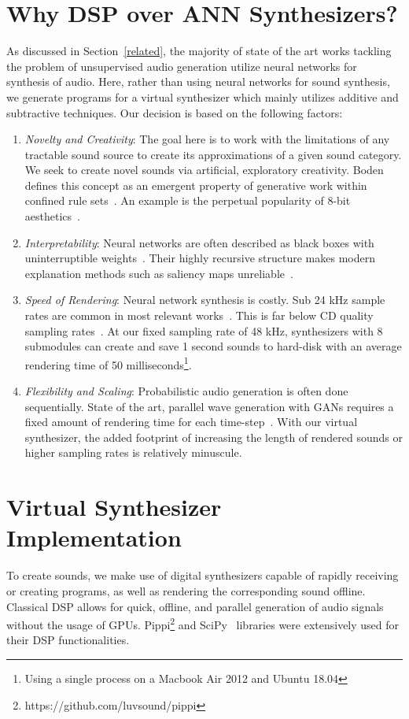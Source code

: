 \documentclass[\main/thesis.tex]{subfiles}
\begin{document}
\section{Why DSP over ANN Synthesizers?}
 As discussed in Section~\ref{related}, the majority of state of the art works tackling the problem of unsupervised audio generation utilize neural networks for synthesis of audio. Here, rather than using neural networks for sound synthesis, we generate programs for a virtual synthesizer which mainly utilizes additive and subtractive techniques. Our decision is based on the following factors:
\begin{enumerate}[label=(\roman*)]
    \item \textit{Novelty and Creativity}: The goal here is to work with the limitations of any tractable sound source to create its approximations of a given sound category. We seek to create novel sounds via artificial, exploratory creativity. Boden defines this concept as an emergent property of generative work within confined rule sets~\cite{boden2009computer}. An example is the perpetual popularity of 8-bit aesthetics~\cite{collins2007loop}. 
    \item \textit{Interpretability}: Neural networks are often described as black boxes with uninterruptible weights~\cite{basheer2000artificial}. Their highly recursive structure makes modern explanation methods such as saliency maps unreliable~\cite{rudin2019stop}.  
    \item \textit{Speed of Rendering}: Neural network synthesis is costly. Sub 24 kHz sample rates are common in most relevant works~\cite{yamamoto2020parallel,oord2017parallel,aouameur2019neural,ramires2020neural}. This is far below CD quality sampling rates~\cite{reiss2016meta}. At our fixed sampling rate of 48 kHz, synthesizers with 8 submodules can create and save 1 second sounds to hard-disk with an average rendering time of 50 milliseconds\footnote{Using a single process on a Macbook Air 2012 and Ubuntu 18.04}. 
    \item \textit{Flexibility and Scaling}: Probabilistic audio generation is often done sequentially. State of the art, parallel wave generation with GANs requires a fixed amount of rendering time for each time-step~\cite{yamamoto2020parallel}. With our virtual synthesizer, the added footprint of increasing the length of rendered sounds or higher sampling rates is relatively minuscule.  
\end{enumerate}

\section{Virtual Synthesizer Implementation}
\label{virtual_synth_implementation}
 To create sounds, we make use of digital synthesizers capable of rapidly receiving or creating programs, as well as rendering the corresponding sound offline. Classical DSP allows for quick, offline, and parallel generation of audio signals without the usage of GPUs. Pippi\footnote{https://github.com/luvsound/pippi} and SciPy~\cite{jones2001scipy} libraries were extensively used for their DSP functionalities. 
\end{document}
